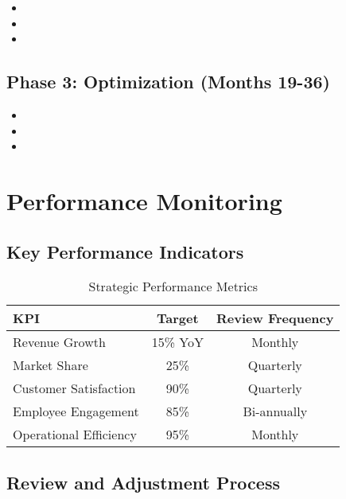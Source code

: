 \documentclass[11pt,a4paper]{article}
\begin{document}
\begin{itemize}[leftmargin=*]
  \item \lipsum[35][1-2]
  \item \lipsum[36][1-2]
  \item \lipsum[37][1-2]
\end{itemize}

\subsection{Phase 3: Optimization (Months 19-36)}

\begin{itemize}[leftmargin=*]
  \item \lipsum[38][1-2]
  \item \lipsum[39][1-2]
  \item \lipsum[40][1-2]
\end{itemize}

\section{Performance Monitoring}

\subsection{Key Performance Indicators}

\begin{table}[h]
\centering
\begin{tabular}{@{}lcc@{}}
\toprule
\textbf{KPI} & \textbf{Target} & \textbf{Review Frequency} \\
\midrule
Revenue Growth & 15\% YoY & Monthly \\
Market Share & 25\% & Quarterly \\
Customer Satisfaction & 90\% & Quarterly \\
Employee Engagement & 85\% & Bi-annually \\
Operational Efficiency & 95\% & Monthly \\
\bottomrule
\end{tabular}
\caption{Strategic Performance Metrics}
\end{table}

\subsection{Review and Adjustment Process}

\lipsum[41-42]
\end{document}
